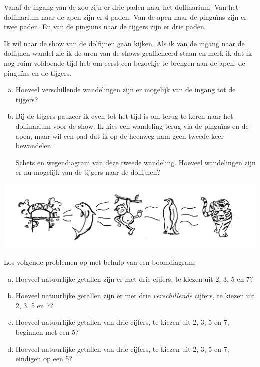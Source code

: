 \documentclass[12pt,twoside]{article}
\begin{document}
\begin{oefening}
Vanaf de ingang van de zoo zijn er drie paden naar het dolfinarium. Van het dolfinarium naar de apen zijn er 4 paden. Van de apen naar de pinguïns zijn er twee paden. En van de pinguïns naar de tijgers zijn er drie paden.

Ik wil naar de show van de dolfijnen gaan kijken. Als ik van de ingang naar de dolfijnen wandel zie ik de uren van de shows geafficheerd staan en merk ik dat ik nog ruim voldoende tijd heb om eerst een bezoekje te brengen aan de apen, de pinguïns en de tijgers.

\begin{enumerate}[(a)]
  \item Hoeveel verschillende wandelingen zijn er mogelijk van de ingang tot de tijgers?
  \item Bij de tijgers pauzeer ik even tot het tijd is om terug te keren naar het dolfinarium voor de show. Ik kies een wandeling terug via de pinguïns en de apen, maar wil een pad dat ik op de heenweg nam geen tweede keer bewandelen.
  
  Schets en wegendiagram van deze tweede wandeling. Hoeveel wandelingen zijn er nu mogelijk van de tijgers naar de dolfijnen?
\end{enumerate}

\begin{center}
  \includegraphics[width=\textwidth]{zoodieren}
\end{center}
\end{oefening}

\begin{oefening}
Los volgende problemen op met behulp van een boomdiagram.
\begin{enumerate}[(a)]
  \item Hoeveel natuurlijke getallen zijn er met drie cijfers, te kiezen uit 2, 3, 5 en 7?
  \item Hoeveel natuurlijke getallen zijn er met drie {\em verschillende} cijfers, te kiezen uit 2, 3, 5 en 7?
  \item Hoeveel natuurlijke getallen van drie cijfers, te kiezen uit 2, 3, 5 en 7, beginnen met een 5?
  \item Hoeveel natuurlijke getallen van drie cijfers, te kiezen uit 2, 3, 5 en 7, eindigen op een 5?
\end{enumerate}
\end{oefening}
\end{document}

